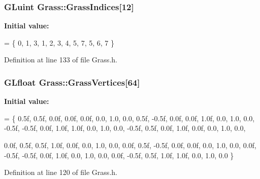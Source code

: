 \subsubsection[{\texorpdfstring{Grass\+Indices}{GrassIndices}}]{\setlength{\rightskip}{0pt plus 5cm}G\+Luint Grass\+::\+Grass\+Indices\mbox{[}12\mbox{]}\hspace{0.3cm}{\ttfamily [private]}}\hypertarget{class_grass_a2a7aecffc8204c7b6d268d91f37eea3d}{}\label{class_grass_a2a7aecffc8204c7b6d268d91f37eea3d}
{\bfseries Initial value\+:}
\begin{DoxyCode}
=
    \{
        0, 1, 3,
        1, 2, 3,
        4, 5, 7,
        5, 6, 7
    \}
\end{DoxyCode}


Definition at line 133 of file Grass.\+h.

\subsubsection[{\texorpdfstring{Grass\+Vertices}{GrassVertices}}]{\setlength{\rightskip}{0pt plus 5cm}G\+Lfloat Grass\+::\+Grass\+Vertices\mbox{[}64\mbox{]}\hspace{0.3cm}{\ttfamily [private]}}\hypertarget{class_grass_ae23b5fc33245f28237d2232c49adcdca}{}\label{class_grass_ae23b5fc33245f28237d2232c49adcdca}
{\bfseries Initial value\+:}
\begin{DoxyCode}
=
    \{
        0.5f,  0.5f,  0.0f, 0.0f, 0.0f, 0.0, 1.0, 0.0,
        0.5f, -0.5f,  0.0f, 0.0f, 1.0f, 0.0, 1.0, 0.0,
        -0.5f, -0.5f,  0.0f, 1.0f, 1.0f, 0.0, 1.0, 0.0,
        -0.5f,  0.5f,  0.0f, 1.0f, 0.0f, 0.0, 1.0, 0.0,

        0.0f,  0.5f,  0.5f, 1.0f, 0.0f, 0.0, 1.0, 0.0,
        0.0f,  0.5f, -0.5f, 0.0f, 0.0f, 0.0, 1.0, 0.0,
        0.0f, -0.5f, -0.5f, 0.0f, 1.0f, 0.0, 1.0, 0.0,
        0.0f, -0.5f,  0.5f, 1.0f, 1.0f, 0.0, 1.0, 0.0
    \}
\end{DoxyCode}


Definition at line 120 of file Grass.\+h.

